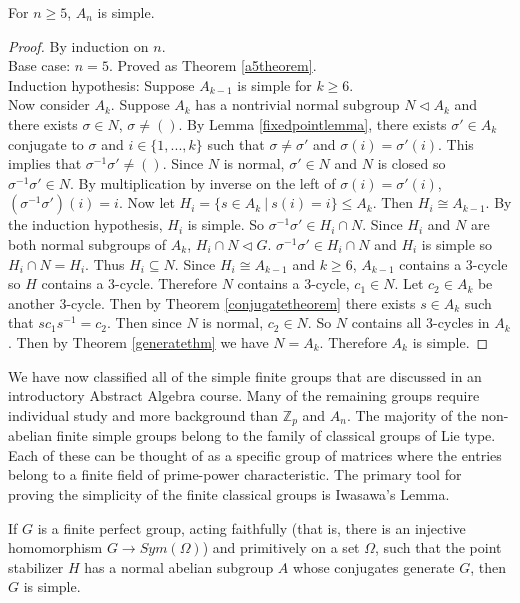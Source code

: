 \documentclass[a4paper]{article}
\begin{document}
\begin{theorem}
\label{antheorem}
For $n \ge 5$, $A_n$ is simple.
\end{theorem}
\begin{proof}
By induction on $n$. \\
Base case: $n = 5$. Proved as Theorem \ref{a5theorem}. \\
Induction hypothesis: Suppose $A_{k-1}$ is simple for $k \ge 6$. \\
Now consider $A_k$. Suppose $A_k$ has a nontrivial normal subgroup $N \triangleleft A_k$ and there exists $\sigma \in N$, $\sigma \ne ()$. By Lemma \ref{fixedpointlemma}, there exists $\sigma' \in A_k$ conjugate to $\sigma$ and $i \in \{1, ..., k\}$ such that $\sigma \ne \sigma'$ and $\sigma(i) = \sigma'(i)$. This implies that $\sigma^{-1} \sigma' \ne ()$. Since $N$ is normal, $\sigma' \in N$ and $N$ is closed so $\sigma^{-1} \sigma' \in N$. By multiplication by inverse on the left of $\sigma(i) = \sigma'(i)$, $(\sigma^{-1} \sigma')(i) = i$. Now let $H_i = \{s \in A_k\ |\ s(i) = i\} \le A_k$. Then $H_i \cong A_{k-1}$. By the induction hypothesis, $H_i$ is simple. So $\sigma^{-1} \sigma' \in H_i \cap N$. Since $H_i$ and $N$ are both normal subgroups of $A_k$, $H_i \cap N \triangleleft G$. $\sigma^{-1} \sigma' \in H_i \cap N$ and $H_i$ is simple so $H_i \cap N = H_i$. Thus $H_i \subseteq N$. Since $H_i \cong A_{k-1}$ and $k \ge 6$, $A_{k-1}$ contains a 3-cycle so $H$ contains a 3-cycle. Therefore $N$ contains a 3-cycle, $c_1 \in N$. Let $c_2 \in A_k$ be another 3-cycle. Then by Theorem \ref{conjugatetheorem} there exists $s \in A_k$ such that $s c_1 s^{-1} = c_2$. Then since $N$ is normal, $c_2 \in N$. So $N$ contains all 3-cycles in $A_k$. Then by Theorem \ref{generatethm} we have $N=A_k$. Therefore $A_k$ is simple.
\end{proof}

We have now classified all of the simple finite groups that are discussed in an introductory Abstract Algebra course. Many of the remaining groups require individual study and more background than $\mathbb{Z}_p$ and $A_n$. The majority of the non-abelian finite simple groups belong to the family of classical groups of Lie type. Each of these can be thought of as a specific group of matrices where the entries belong to a finite field of prime-power characteristic. The primary tool for proving the simplicity of the finite classical groups is Iwasawa's Lemma.

\begin{lemma}
If $G$ is a finite perfect group, acting faithfully (that is, there is an injective homomorphism $G \rightarrow Sym(\Omega)$) and primitively on a set $\Omega$, such that the point stabilizer $H$ has a normal abelian subgroup $A$ whose conjugates generate $G$, then $G$ is simple.
\end{lemma}
\end{document}
